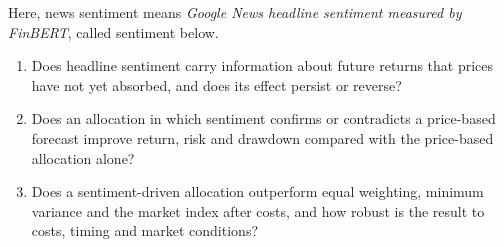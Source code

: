 Here, news sentiment means \emph{Google News headline sentiment measured by FinBERT}, called sentiment below.
\begin{enumerate}
\item[\textbf{RQ1}] Does headline sentiment carry information about future returns that prices have not yet absorbed, and does its effect persist or reverse?
\item[\textbf{RQ2}] Does an allocation in which sentiment confirms or contradicts a price-based forecast improve return, risk and drawdown compared with the price-based allocation alone?
\item[\textbf{RQ3}] Does a sentiment-driven allocation outperform equal weighting, minimum variance and the market index after costs, and how robust is the result to costs, timing and market conditions?
\end{enumerate}

